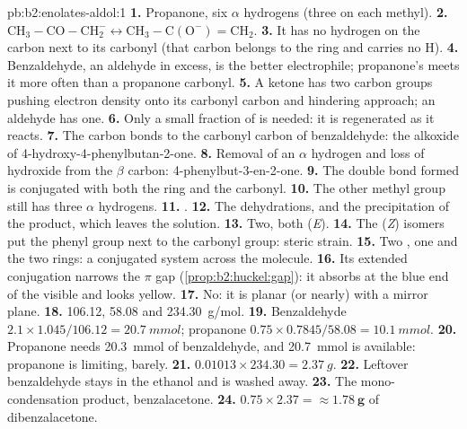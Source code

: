 \begin{solution}{pb:b2:enolates-aldol:1}
\textbf{1.} Propanone, six $\alpha$ hydrogens (three on each methyl).
\textbf{2.} $\mathrm{CH_3{-}CO{-}CH_2^-} \leftrightarrow \mathrm{CH_3{-}C(O^-){=}CH_2}$.
\textbf{3.} It has no hydrogen on the carbon next to its carbonyl (that carbon belongs to the ring and
carries no H).
\textbf{4.} Benzaldehyde, an aldehyde in excess, is the better electrophile; propanone's  meets it
more often than a propanone carbonyl.
\textbf{5.} A ketone has two carbon groups pushing electron density onto its carbonyl carbon and
hindering approach; an aldehyde has one.
\textbf{6.} Only a small fraction of  is needed: it is regenerated as it reacts.
\textbf{7.} The  carbon bonds to the carbonyl carbon of benzaldehyde: the alkoxide of
4-hydroxy-4-phenylbutan-2-one.
\textbf{8.} Removal of an $\alpha$ hydrogen and loss of hydroxide from the $\beta$ carbon: 4-phenylbut-3-en-2-one.
\textbf{9.} The double bond formed is conjugated with both the ring and the carbonyl.
\textbf{10.} The other methyl group still has three $\alpha$ hydrogens.
\textbf{11.} .
\textbf{12.} The dehydrations, and the precipitation of the product, which leaves the solution.
\textbf{13.} Two, both (\textit{E}).
\textbf{14.} The (\textit{Z}) isomers put the phenyl group next to the carbonyl group: steric strain.
\textbf{15.} Two , one  and the two rings: a conjugated system across the molecule.
\textbf{16.} Its extended conjugation narrows the $\pi$ gap (\cref{prop:b2:huckel:gap}): it absorbs at the
blue end of the visible and looks yellow.
\textbf{17.} No: it is planar (or nearly) with a mirror plane.
\textbf{18.} 106.12, 58.08 and \qty{234.30}{g/mol}.
\textbf{19.} Benzaldehyde $2.1 \times 1.045/106.12 = \qty{20.7}{mmol}$; propanone $0.75 \times
0.7845/58.08 = \qty{10.1}{mmol}$.
\textbf{20.} Propanone needs \qty{20.3}{mmol} of benzaldehyde, and \qty{20.7}{mmol} is available:
propanone is limiting, barely.
\textbf{21.} $0.01013 \times 234.30 = \qty{2.37}{g}$.
\textbf{22.} Leftover benzaldehyde stays in the ethanol and is washed away.
\textbf{23.} The mono-condensation product, benzalacetone.
\textbf{24.} $0.75 \times 2.37 = \boldsymbol{\approx \qty{1.78}{g}}$ of dibenzalacetone.
\end{solution}
